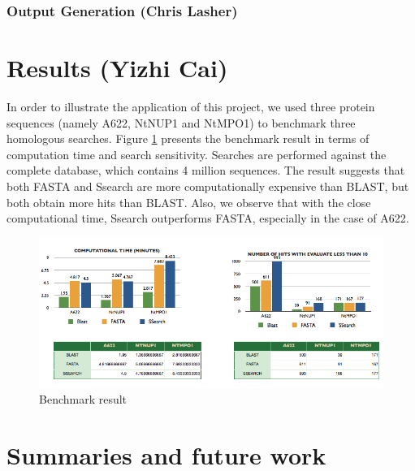 \documentclass[11pt,letterpaper,twoside,english]{article}
\begin{document}









\subsubsection{\label{sub:Output-Generation}Output Generation (Chris Lasher)}


\section{Results (Yizhi Cai)}

In order to illustrate the application of this project, we used three
protein sequences (namely A622, NtNUP1 and NtMPO1) to benchmark three
homologous searches. Figure \ref{fig:Benchmark-result} presents the
benchmark result in terms of computation time and search sensitivity.
Searches are performed against the complete database, which contains
4 million sequences. The result suggests that both FASTA and Ssearch
are more computationally expensive than BLAST, but both obtain more
hits than BLAST. Also, we observe that with the close computational
time, Ssearch outperforms FASTA, especially in the case of A622.

%
\begin{figure}[H]
\begin{centering}
\includegraphics[width=0.8\linewidth]{figures/Bench_mark_result}
\par\end{centering}

\caption{\label{fig:Benchmark-result}Benchmark result}

\end{figure}



\section{Summaries and future work}
\end{document}
